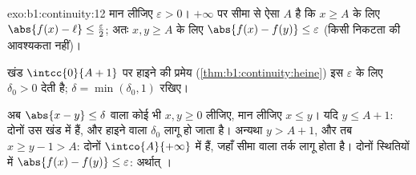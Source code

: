 \begin{solution}{exo:b1:continuity:12}
मान लीजिए $\varepsilon > 0$। $+\infty$ पर सीमा से ऐसा $A$ है कि $x \geq A$
के लिए $\abs{f(x) - \ell} \leq \frac\varepsilon2$; अतः $x, y \geq A$ के लिए
$\abs{f(x) - f(y)} \leq \varepsilon$ (किसी निकटता की आवश्यकता नहीं)।

खंड $\intcc{0}{A + 1}$ पर हाइने की प्रमेय (\cref{thm:b1:continuity:heine})
इस $\varepsilon$ के लिए $\delta_0 > 0$ देती है; $\delta = \min(\delta_0, 1)$
रखिए।

अब $\abs{x - y} \leq \delta$ वाला कोई भी $x, y \geq 0$ लीजिए, मान लीजिए $x
\leq y$। यदि $y \leq A + 1$: दोनों उस खंड में हैं, और हाइने वाला $\delta_0$
लागू हो जाता है। अन्यथा $y > A + 1$, और तब $x \geq y - 1 > A$: दोनों
$\intco{A}{+\infty}$ में हैं, जहाँ सीमा वाला तर्क लागू होता है। दोनों
स्थितियों में $\abs{f(x) - f(y)} \leq \varepsilon$: अर्थात् ।
\end{solution}

